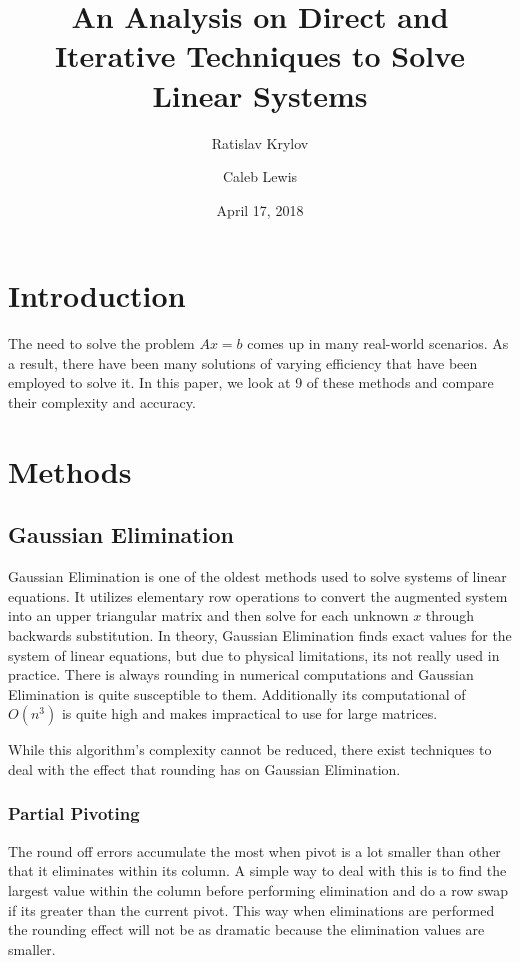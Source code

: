 \documentclass[11pt]{article}	%
\title{An Analysis on Direct and Iterative Techniques to Solve Linear Systems}
\author{Ratislav Krylov \and Caleb Lewis}
\date{April 17, 2018} %
\begin{document}
\maketitle


\section{Introduction}
The need to solve the problem $Ax = b$ comes up in many real-world scenarios.
As a result, there have been many solutions of varying efficiency that
have been employed to solve it. In this paper, we look at 9 of these methods and
compare their complexity and accuracy.


\section{Methods}

\subsection{Gaussian Elimination}
Gaussian Elimination is one of the oldest methods used to solve systems of linear equations. It utilizes elementary row operations to convert the augmented system into an upper triangular matrix and then solve for each unknown $x$ through backwards substitution. In theory, Gaussian Elimination finds exact values for the system of linear equations, but due to physical limitations, its not really used in practice. There is always rounding in numerical computations and Gaussian Elimination is quite susceptible to them. Additionally its computational of $O(n^3)$ is quite high and makes impractical to use for large matrices. 

While this algorithm's complexity cannot be reduced, there exist techniques to deal with the effect that rounding has on Gaussian Elimination. 

    \subsubsection{Partial Pivoting}
    The round off errors accumulate the most when pivot is a lot smaller than other that it eliminates within its column. A simple way to deal with this is to find the largest value within the column before performing elimination and do a row swap if its greater than the current pivot. This way when eliminations are performed the rounding effect will not be as dramatic because the elimination values are smaller. 
\end{document}
